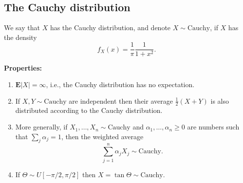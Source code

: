 \documentclass[12pt]{article}
\newcommand{\expec}{\mathbf{E}}
\newcommand{\cauchydist}{\textrm{Cauchy}}
\theoremstyle{example}
\begin{document}
\subsection{The Cauchy distribution}

We say that $X$ has the Cauchy distribution, and denote $X \sim \cauchydist$, if $X$ has the density
$$ 
f_X(x) = \frac{1}{\pi} \frac{1}{1+x^2}.
$$

\noindent \textbf{Properties:}
\begin{enumerate}
\item $\expec |X|=\infty$, i.e., the Cauchy distribution has no expectation.
\item If $X,Y \sim \cauchydist$ are independent then their average $\frac12(X+Y)$ is also distributed according to the Cauchy distribution.
\item More generally, if $X_1,\ldots,X_n \sim \cauchydist$ and $\alpha_1,\ldots,\alpha_n\ge 0$ are numbers such that $\sum_j \alpha_j = 1$, then the weighted average
$$ \sum_{j=1}^n \alpha_j X_j \sim \cauchydist. $$
\item If $\Theta \sim U[-\pi/2,\pi/2]$ then $X=\tan \Theta \sim \cauchydist$.
\end{enumerate}


\newpage
\end{document}
